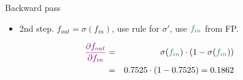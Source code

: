\begin{vbframe}{Backward pass}
  \begin{itemize}
    \item 2nd step. $f_{out} = \sigma(f_{in})$, use rule for $\sigma'$, use $\textcolor{teal}{f_{in}}$ from FP.
  \end{itemize}
    \begin{eqnarray*}
      \textcolor{violet}{\frac{\partial f_{out}}{\partial f_{in}}}  &=& \sigma(\textcolor{teal}{f_{in}})\cdot(1-\sigma(\textcolor{teal}{f_{in}})) \\
      &=& \num[round-mode=places,round-precision=4]{0.7525469} \cdot (1 - \num[round-mode=places,round-precision=4]{0.7525469}) = \num[round-mode=places,round-precision=4]{0.1862201}
    \end{eqnarray*}
      \vspace{-0.5cm}
    \begin{figure}
      \centering
    \end{figure}
\framebreak


\end{vbframe}
